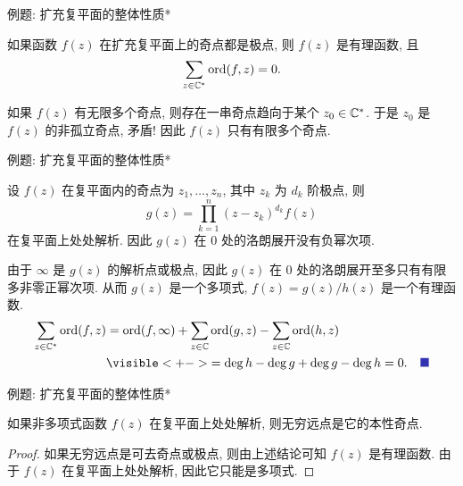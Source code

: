 \begin{frame}{例题: 扩充复平面的整体性质*}
\begin{example}
如果函数 $f(z)$ 在扩充复平面上的奇点都是极点, 则 $f(z)$ 是有理函数, 且
\[\sum_{z\in{\mathbb{C}}^*}{\mathrm{ord}}(f,z)=0.\]
\end{example}
\begin{proofs}
\indent
如果 $f(z)$ 有无限多个奇点, 则存在一串奇点趋向于某个 $z_0\in{\mathbb{C}}^*$.
\onslide<+->
于是 $z_0$ 是 $f(z)$ 的非孤立奇点, 矛盾!
\onslide<+->
因此 $f(z)$ 只有有限多个奇点.
\end{proofs}
\end{frame}


\begin{frame}{例题: 扩充复平面的整体性质*}
\beqskip{8pt}
\begin{proofc}
\indent
设 $f(z)$ 在复平面内的奇点为 $z_1,\dots,z_n$, 其中 $z_k$ 为 $d_k$ 阶极点,
\onslide<+->
则
\[g(z)=\prod_{k=1}^n(z-z_k)^{d_k}f(z)\]
在复平面上处处解析.
\onslide<+->
因此 $g(z)$ 在 $0$ 处的洛朗展开没有负幂次项.

\indent
\onslide<+->
由于 $\infty$ 是 $g(z)$ 的解析点或极点, 因此 $g(z)$ 在 $0$ 处的洛朗展开至多只有有限多非零正幂次项.
\onslide<+->
从而 $g(z)$ 是一个多项式, $f(z)=g(z)/h(z)$ 是一个有理函数.
\onslide<+->
\begin{align*}
\sum_{z\in\BC^*}\ord(f,z)&
=\ord(f,\infty)+\sum_{z\in\BC}\ord(g,z)-\sum_{z\in\BC}\ord(h,z)\\
&\visible<+->{=\deg h-\deg g+\deg g-\deg h=0.\mqed}
\end{align*}
\vspace{-\baselineskip}
\end{proofc}
\endgroup
\end{frame}


\begin{frame}{例题: 扩充复平面的整体性质*}
\begin{example}
如果非多项式函数 $f(z)$ 在复平面上处处解析, 则无穷远点是它的本性奇点.
\end{example}
\begin{proof}
如果无穷远点是可去奇点或极点, 则由上述结论可知 $f(z)$ 是有理函数.
\onslide<+->
由于 $f(z)$ 在复平面上处处解析, 因此它只能是多项式.
\end{proof}
\end{frame}

